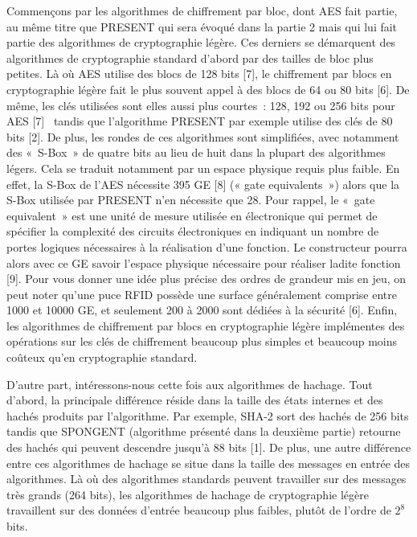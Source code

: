	Commençons par les algorithmes de chiffrement par bloc, dont AES fait partie,
	au même titre que PRESENT qui sera évoqué dans la partie 2 mais qui lui fait
	partie des algorithmes de cryptographie légère. Ces derniers se démarquent des
	algorithmes de cryptographie standard d’abord par des tailles de bloc plus
	petites. Là où AES utilise des blocs de 128 bits [7], le chiffrement par blocs
	en cryptographie légère fait le plus souvent appel à des blocs de 64 ou 80
	bits [6]. De même, les clés utilisées sont elles aussi plus courtes : 128, 192
	ou 256 bits pour AES [7]  tandis que l’algorithme PRESENT par exemple utilise
	des clés de 80 bits [2]. De plus, les rondes de ces algorithmes sont
	simplifiées, avec notamment des « S-Box » de quatre bits au lieu de huit dans
	la plupart des algorithmes légers. Cela se traduit notamment par un espace
	physique requis plus faible. En effet, la S-Box de l’AES nécessite 395 GE [8] («
	gate equivalents ») alors que la S-Box utilisée par PRESENT n’en nécessite que
	28. Pour rappel, le « gate equivalent » est une unité de mesure utilisée en
	électronique qui permet de spécifier la complexité des circuits électroniques
	en indiquant un nombre de portes logiques nécessaires à la réalisation d’une
	fonction. Le constructeur pourra alors avec ce GE savoir l’espace physique
	nécessaire pour réaliser ladite fonction [9]. Pour vous donner une idée plus
	précise des ordres de grandeur mis en jeu, on peut noter qu’une puce RFID
	possède une surface généralement comprise entre 1000 et 10000 GE, et seulement
	200 à 2000 sont dédiées à la sécurité [6]. Enfin, les algorithmes de
	chiffrement par blocs en cryptographie légère implémentes des opérations sur
	les clés de chiffrement beaucoup plus simples et beaucoup moins coûteux qu’en
	cryptographie standard.

	D’autre part, intéressons-nous cette fois aux algorithmes de hachage. Tout
	d’abord, la principale différence réside dans la taille des états internes et
	des hachés produits par l’algorithme. Par exemple, SHA-2 sort des hachés de
	256 bits tandis que SPONGENT (algorithme présenté dans la deuxième partie)
	retourne des hachés qui peuvent descendre jusqu’à 88 bits [1]. De plus, une
	autre différence entre ces algorithmes de hachage se situe dans la taille des
	messages en entrée des algorithmes. Là où des algorithmes standards peuvent
	travailler sur des messages très grands (264 bits), les algorithmes de hachage
	de cryptographie légère travaillent sur des données d’entrée beaucoup plus
	faibles, plutôt de l’ordre de $2^8$ bits.

